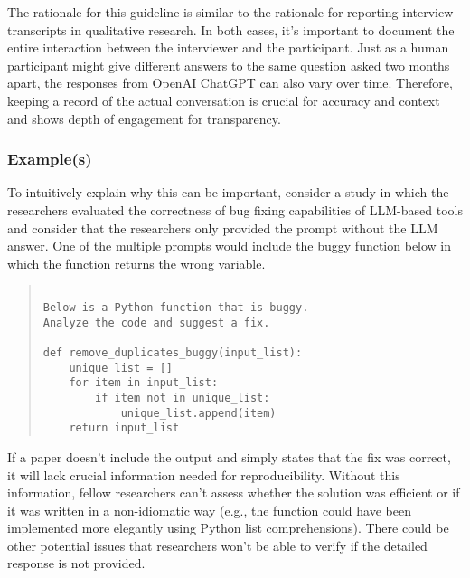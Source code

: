 The rationale for this guideline is similar to the rationale for reporting interview transcripts in qualitative research. In both cases, it's important to document the entire interaction between the interviewer and the participant. Just as a human participant might give different answers to the same question asked two months apart, the responses from OpenAI ChatGPT can also vary over time. Therefore, keeping a record of the actual conversation is crucial for accuracy and context and shows depth of engagement for transparency.



\subsubsection{Example(s)}

To intuitively explain why this can be important, consider a study in which the researchers evaluated the correctness of bug fixing capabilities of LLM-based tools and consider that the researchers only provided the prompt without the LLM answer. One of the multiple prompts would include the buggy function below in which the function returns the wrong variable. 

\begin{quote}
\begin{verbatim}

Below is a Python function that is buggy. 
Analyze the code and suggest a fix.

def remove_duplicates_buggy(input_list):
    unique_list = []
    for item in input_list:
        if item not in unique_list:
            unique_list.append(item)
    return input_list 

\end{verbatim}
\end{quote}

If a paper doesn't include the output and simply states that the fix was correct, it will lack crucial information needed for reproducibility. Without this information, fellow researchers can't assess whether the solution was efficient or if it was written in a non-idiomatic way (e.g., the function could have been implemented more elegantly using Python list comprehensions). There could be other potential issues that researchers won't be able to verify if the detailed response is not provided.


